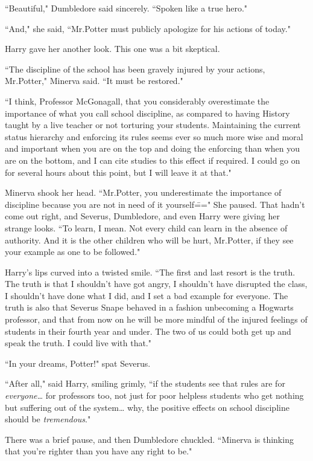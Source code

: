 ``Beautiful," Dumbledore said sincerely. ``Spoken like a true hero."

``And," she said, ``Mr.\?Potter must publicly apologize for his actions of today."

Harry gave her another look. This one was a bit skeptical.

``The discipline of the school has been gravely injured by your actions, Mr.\?Potter," Minerva said. ``It must be restored."

``I think, Professor McGonagall, that you considerably overestimate the importance of what you call school discipline, as compared to having History taught by a live teacher or not torturing your students. Maintaining the current status hierarchy and enforcing its rules seems ever so much more wise and moral and important when you are on the top and doing the enforcing than when you are on the bottom, and I can cite studies to this effect if required. I could go on for several hours about this point, but I will leave it at that."

Minerva shook her head. ``Mr.\?Potter, you underestimate the importance of discipline because you are not in need of it yourself\===" She paused. That hadn't come out right, and Severus, Dumbledore, and even Harry were giving her strange looks. ``To learn, I mean. Not every child can learn in the absence of authority. And it is the other children who will be hurt, Mr.\?Potter, if they see your example as one to be followed."

Harry's lips curved into a twisted smile. ``The first and last resort is the truth. The truth is that I shouldn't have got angry, I shouldn't have disrupted the class, I shouldn't have done what I did, and I set a bad example for everyone. The truth is also that Severus Snape behaved in a fashion unbecoming a Hogwarts professor, and that from now on he will be more mindful of the injured feelings of students in their fourth year and under. The two of us could both get up and speak the truth. I could live with that."

``In your dreams, Potter!" spat Severus.

``After all," said Harry, smiling grimly, ``if the students see that rules are for \emph{everyone{\ldots}} for professors too, not just for poor helpless students who get nothing but suffering out of the system{\ldots} why, the positive effects on school discipline should be \emph{tremendous}."

There was a brief pause, and then Dumbledore chuckled. ``Minerva is thinking that you're righter than you have any right to be."

